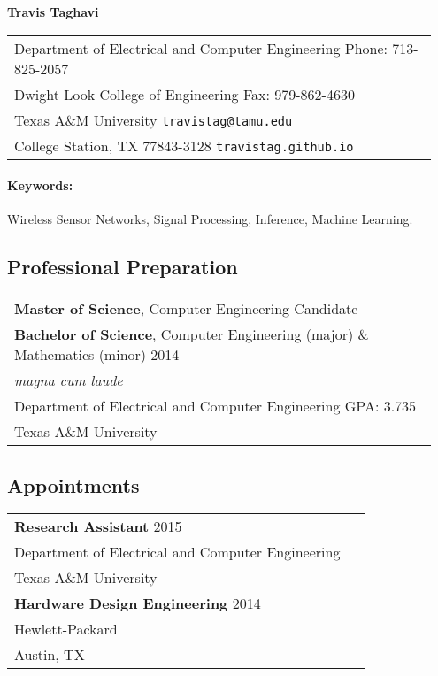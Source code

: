 \documentclass[11pt]{article}
\begin{document}
\begin{center}
{\bfseries \Large Travis Taghavi}
\end{center}

\begin{center}
\begin{tabular}{p{0.95\linewidth}}
Department of Electrical and Computer Engineering
\hfill Phone: 713-825-2057 \\
Dwight Look College of Engineering
\hfill Fax: 979-862-4630 \\
Texas A\&M University
\hfill \texttt{travistag@tamu.edu} \\
College Station, TX 77843-3128
\hfill \texttt{travistag.github.io}
\end{tabular}
\end{center}

\paragraph{Keywords:} Wireless Sensor Networks, Signal Processing, Inference, Machine Learning.

\subsection*{Professional Preparation}

\begin{center}
\begin{tabular}{p{0.95\linewidth}}
\textbf{Master of Science}, Computer Engineering \hfill Candidate \\
\textbf{Bachelor of Science}, Computer Engineering (major) \& Mathematics (minor) \hfill 2014 \\
{\em magna cum laude}\\
Department of Electrical and Computer Engineering \hfill GPA: 3.735\\
Texas A\&M University
\end{tabular}
\end{center}

\subsection*{Appointments}

\begin{center}
\begin{tabular}{p{0.95\linewidth}}
\textbf{Research Assistant} \hfill 2015 \\
Department of Electrical and Computer Engineering \\
Texas A\&M University \\[4pt]
\textbf{Hardware Design Engineering} \hfill 2014 \\
Hewlett-Packard \\
Austin, TX
\end{tabular}
\end{center}
\end{document}
